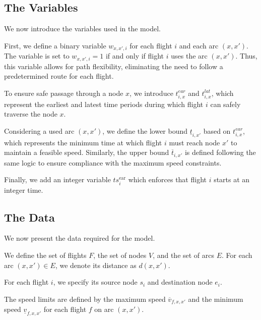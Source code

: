 \documentclass[../../thesis.tex]{subfiles}
\begin{document}
\subsection{The Variables} \label{sec:modelVar}  

We now introduce the variables used in the model.  

First, we define a binary variable \( w_{x,x',i} \) for each flight \( i \) and each arc \( (x,x') \).  
The variable is set to \( w_{x,x',i} = 1 \) if and only if flight \( i \) uses the arc \( (x,x') \).  
Thus, this variable allows for path flexibility, eliminating the need to follow a predetermined route for each flight.  

To ensure safe passage through a node \( x \), we introduce \( t^{ear}_{i,x} \) and \( t^{lat}_{i,x} \), which represent the earliest and latest time periods during which flight \( i \) can safely traverse the node \( x \).  

Considering a used arc \( (x,x') \), we define the lower bound \( \underline{t}_{i,x'} \) based on \( t^{ear}_{i,x} \), which represents the minimum time at which flight \( i \) must reach node \( x' \) to maintain a feasible speed.  
Similarly, the upper bound \( \overline{t}_{i,x'} \) is defined following the same logic to ensure compliance with the maximum speed constraints.  

Finally, we add an integer variable \( ts^\text{ear}_i \) which enforces that flight \( i \) starts at an integer time.

\subsection{The Data} \label{sec:modelData}  

We now present the data required for the model.  

We define the set of flights \( F \), the set of nodes \( V \), and the set of arcs \( E \).  
For each arc \( (x,x') \in E \), we denote its distance as \( d(x,x') \).  

For each flight \( i \), we specify its source node \( s_i \) and destination node \( e_i \).  

The speed limits are defined by the maximum speed \( \overline{v}_{f,x,x'} \) and the minimum speed \( \underline{v}_{f,x,x'} \) for each flight \( f \) on arc \( (x,x') \).  
\end{document}
